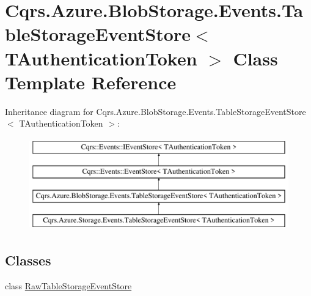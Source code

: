\hypertarget{classCqrs_1_1Azure_1_1BlobStorage_1_1Events_1_1TableStorageEventStore}{}\section{Cqrs.\+Azure.\+Blob\+Storage.\+Events.\+Table\+Storage\+Event\+Store$<$ T\+Authentication\+Token $>$ Class Template Reference}
\label{classCqrs_1_1Azure_1_1BlobStorage_1_1Events_1_1TableStorageEventStore}
Inheritance diagram for Cqrs.\+Azure.\+Blob\+Storage.\+Events.\+Table\+Storage\+Event\+Store$<$ T\+Authentication\+Token $>$\+:\begin{figure}[H]
\begin{center}
\leavevmode
\includegraphics[height=4.000000cm]{classCqrs_1_1Azure_1_1BlobStorage_1_1Events_1_1TableStorageEventStore}
\end{center}
\end{figure}
\subsection*{Classes}
\begin{DoxyCompactItemize}
\item 
class \hyperlink{classCqrs_1_1Azure_1_1BlobStorage_1_1Events_1_1TableStorageEventStore_1_1RawTableStorageEventStore}{Raw\+Table\+Storage\+Event\+Store}
\end{DoxyCompactItemize}
